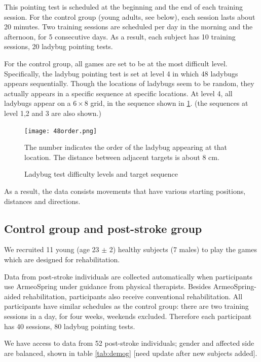 This pointing test is scheduled at the beginning and the end of each training session. For the control group (young adults, see below), each session lasts about 20 minutes. 
Two training sessions are scheduled per day in the morning and the afternoon, for 5 consecutive days. 
As a result, each subject has 10 training sessions, 20 ladybug pointing tests. 

For the control group, all games are set to be at the most difficult level. 
Specifically, the ladybug pointing test is set at level 4 in which 48 ladybugs appears sequentially. 
Though the locations of ladybugs seem to be random, they actually appears in a specific sequence at specific locations. 
At level 4, all ladybugs appear on a $6\times8$ grid, in the sequence shown in \ref{fig:48order}. (the sequences at level 1,2 and 3 are also shown.) 

\begin{figure}
	\texttt{[image: 48order.png]}
	\centering
	\caption{Ladybug test difficulty levels and target sequence}
	\medskip
	\small The number indicates the order of the ladybug appearing at that location. The distance between adjacent targets is about 8 cm.
	\label{fig:48order}
\end{figure}

As a result, the data consists movements that have various starting positions, distances and directions.

\subsection{Control group and post-stroke group}

We recruited 11 young (age 23 $\pm$ 2) healthy subjects (7 males) to play the games which are designed for rehabilitation.

Data from post-stroke individuals are collected automatically when participants use ArmeoSpring under guidance from physical therapists. 
Besides ArmeoSpring-aided rehabilitation, participants also receive conventional rehabilitation.
All participants have similar schedules as the control group: there are two training sessions in a day, for four weeks, weekends excluded. Therefore each participant has 40 sessions, 80 ladybug pointing tests.

We have access to data from 52 post-stroke individuals; gender and affected side are balanced, shown in table \ref{tab:demog} [need update after new subjects added]. 


